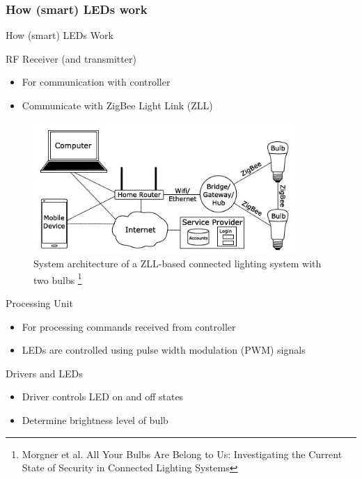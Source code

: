 \documentclass[11pt,t,usepdftitle=false,aspectratio=169]{beamer}
\begin{document}
\subsubsection{How (smart) LEDs work}%
\label{sub:how_smart_leds_work}
\begin{frame}{How (smart) LEDs Work}
     {
        \begin{block}{RF Receiver (and transmitter)}
            \begin{itemize}
                \item For communication with controller
                \item Communicate with ZigBee Light Link (ZLL)
            \end{itemize}
        \end{block}
    }
     {
         \begin{figure}
            \centering
            \includegraphics[height=5cm,keepaspectratio]{img/ZLL.JPG}
            \caption{System architecture of a ZLL-based connected lighting system with two bulbs \footnote{Morgner et al. All Your Bulbs Are Belong to Us: Investigating the Current State of Security in Connected Lighting Systems}}
         \end{figure}
        
    }
     {
        \begin{block}{Processing Unit}
            \begin{itemize}
                \item For processing commands received from controller
                \item LEDs are controlled using pulse width modulation (PWM) signals
            \end{itemize}
        \end{block}
        
    }
     {
        \begin{block}{Drivers and LEDs}
            \begin{itemize}
                \item Driver controls LED on and off states
                \item Determine brightness level of bulb
            \end{itemize}
        \end{block}
        
    }
\end{frame}
\end{document}

